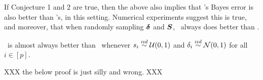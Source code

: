 \documentclass[10pt]{article}
\begin{document}



If Conjecture 1 and 2 are true, then the above also implies that \Lol's Bayes error is also better than \Pca's, in this setting.
Numerical experiments suggest this is true, and moreover, that when randomly sampling $\boldsymbol{\delta}$ and $\boldsymbol{S}$, \Lol~always does better than \Pca.





\begin{conj}
\Lol~is almost always better than \Pca~whenever $s_i \overset{iid}{\sim} \mathcal{U}(0,1)$ and $\delta_i \overset{iid}{\sim} \mathcal{N}(0,1)$ for all $i \in [p]$.
\end{conj}

XXX the below proof is just silly and wrong. XXX
\end{document}
